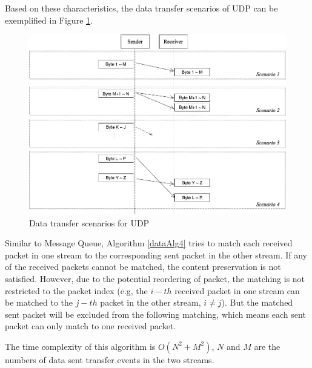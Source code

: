 Based on these characteristics, the data transfer scenarios of UDP can be exemplified in Figure \ref{upd}.
\begin{figure}[H]
\centerline{\includegraphics[scale=0.4]{Figures/udp}}
 \caption{Data transfer scenarios for UDP}
\label{upd}
\end{figure}

Similar to Message Queue, Algorithm \ref{dataAlg4} tries to match each received packet in one stream to the corresponding sent packet in the other stream. If any of the received packets cannot be matched, the content preservation is not satisfied. However, due to the potential reordering of packet, the matching is not restricted to the packet index (e.g, the $i-th$ received packet in one stream can be matched to the $j-th$ packet in the other stream, $i \neq j$). But the matched sent packet will be excluded from the following matching, which means each sent packet can only match to one received packet.

The time complexity of this algorithm is $O(N^2+M^2)$, $N$ and $M$ are the numbers of data sent transfer events in the two streams.

